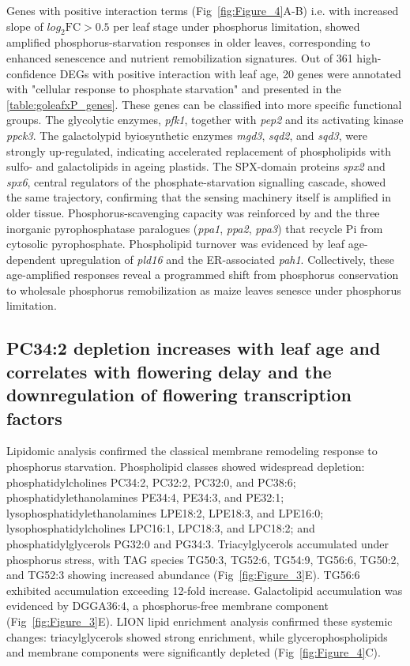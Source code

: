 \documentclass[9pt,twocolumn,twoside]{rilabRxiv}
\begin{document}
Genes with positive interaction terms (Fig~\ref{fig:Figure_4}A-B) i.e. with increased slope of $log_2{\text{FC}}>0.5$ per leaf stage under phosphorus limitation, showed amplified phosphorus-starvation responses in older leaves, corresponding to enhanced senescence and nutrient remobilization signatures.
Out of 361 high-confidence DEGs with positive interaction with leaf age, 20 genes were annotated with "cellular response to phosphate starvation" and presented in the \ref{table:goleafxP_genes}.
These genes can be classified into more specific functional groups.
The glycolytic enzymes, \textit{pfk1}, together with \textit{pep2} and its activating kinase \textit{ppck3}.
The galactolypid byiosynthetic enzymes \textit{mgd3}, \textit{sqd2}, and \textit{sqd3}, were strongly up-regulated, indicating accelerated replacement of phospholipids with sulfo- and galactolipids in ageing plastids.
The SPX-domain proteins \textit{spx2} and \textit{spx6}, central regulators of the phosphate-starvation signalling cascade, showed the same trajectory, confirming that the sensing machinery itself is amplified in older tissue.
Phosphorus-scavenging capacity was reinforced by  and the three inorganic pyrophosphatase paralogues (\textit{ppa1}, \textit{ppa2}, \textit{ppa3}) that recycle Pi from cytosolic pyrophosphate.
Phospholipid turnover was evidenced by leaf age-dependent upregulation of  \textit{pld16} and the ER-associated \textit{pah1}.
Collectively, these age-amplified responses reveal a programmed shift from phosphorus conservation to wholesale phosphorus remobilization as maize leaves senesce under phosphorus limitation.

\subsection*{PC34:2 depletion increases with leaf age and correlates with flowering delay and the downregulation of flowering transcription factors}

Lipidomic analysis confirmed the classical membrane remodeling response to phosphorus starvation.
Phospholipid classes showed widespread depletion: phosphatidylcholines PC34:2, PC32:2, PC32:0, and PC38:6; phosphatidylethanolamines PE34:4, PE34:3, and PE32:1; lysophosphatidylethanolamines LPE18:2, LPE18:3, and LPE16:0; lysophosphatidylcholines LPC16:1, LPC18:3, and LPC18:2; and phosphatidylglycerols PG32:0 and PG34:3.
Triacylglycerols accumulated under phosphorus stress, with TAG species TG50:3, TG52:6, TG54:9, TG56:6, TG50:2, and TG52:3 showing increased abundance (Fig~\ref{fig:Figure_3}E).
TG56:6 exhibited accumulation exceeding 12-fold increase.
Galactolipid accumulation was evidenced by DGGA36:4, a phosphorus-free membrane component (Fig~\ref{fig:Figure_3}E).
LION lipid enrichment analysis confirmed these systemic changes: triacylglycerols showed strong enrichment, while glycerophospholipids and membrane components were significantly depleted (Fig~\ref{fig:Figure_4}C).  
\end{document}
